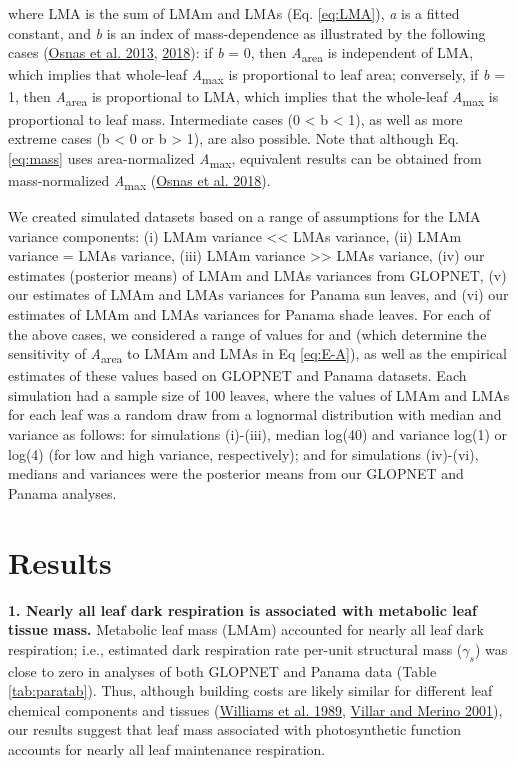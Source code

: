 \documentclass[
  12pt,
]{article}
\begin{document}
where LMA is the sum of LMAm and LMAs (Eq. \eqref{eq:LMA}), \emph{a} is a fitted constant, and \emph{b} is an index of mass-dependence as illustrated by the following cases (\protect\hyperlink{ref-Osnas2013}{Osnas et al. 2013}, \protect\hyperlink{ref-Osnas2018}{2018}): if \emph{b} = 0, then \emph{A}\textsubscript{area} is independent of LMA, which implies that whole-leaf \emph{A}\textsubscript{max} is proportional to leaf area; conversely, if \emph{b} = 1, then \emph{A}\textsubscript{area} is proportional to LMA, which implies that the whole-leaf \emph{A}\textsubscript{max} is proportional to leaf mass.
Intermediate cases (0 \textless{} b \textless{} 1), as well as more extreme cases (b \textless{} 0 or b \textgreater{} 1), are also possible.
Note that although Eq. \eqref{eq:mass} uses area-normalized \emph{A}\textsubscript{max}, equivalent results can be obtained from mass-normalized \emph{A}\textsubscript{max} (\protect\hyperlink{ref-Osnas2018}{Osnas et al. 2018}).

We created simulated datasets based on a range of assumptions for the LMA variance components: (i) LMAm variance \textless\textless{} LMAs variance, (ii) LMAm variance = LMAs variance, (iii) LMAm variance \textgreater\textgreater{} LMAs variance, (iv) our estimates (posterior means) of LMAm and LMAs variances from GLOPNET, (v) our estimates of LMAm and LMAs variances for Panama sun leaves, and (vi) our estimates of LMAm and LMAs variances for Panama shade leaves.
For each of the above cases, we considered a range of values for and (which determine the sensitivity of \emph{A}\textsubscript{area} to LMAm and LMAs in Eq \eqref{eq:E-A}), as well as the empirical estimates of these values based on GLOPNET and Panama datasets.
Each simulation had a sample size of 100 leaves, where the values of LMAm and LMAs for each leaf was a random draw from a lognormal distribution with median and variance as follows: for simulations (i)-(iii), median log(40) and variance log(1) or log(4) (for low and high variance, respectively); and for simulations (iv)-(vi), medians and variances were the posterior means from our GLOPNET and Panama analyses.

\hypertarget{results}{%
\section{Results}\label{results}}

\textbf{1. Nearly all leaf dark respiration is associated with metabolic leaf tissue mass.}
Metabolic leaf mass (LMAm) accounted for nearly all leaf dark respiration; i.e., estimated dark respiration rate per-unit structural mass (\(\gamma_s\)) was close to zero in analyses of both GLOPNET and Panama data (Table \ref{tab:paratab}).
Thus, although building costs are likely similar for different leaf chemical components and tissues (\protect\hyperlink{ref-Williams1989}{Williams et al. 1989}, \protect\hyperlink{ref-Villar2001}{Villar and Merino 2001}), our results suggest that leaf mass associated with photosynthetic function accounts for nearly all leaf maintenance respiration.
\end{document}
